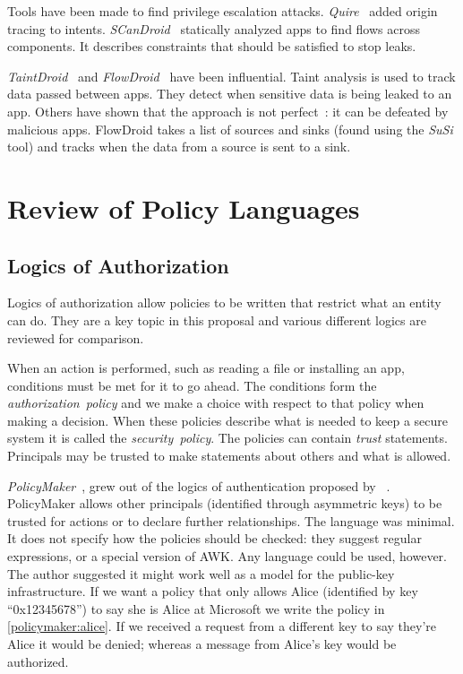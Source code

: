 \documentclass[a4paper,sfsidenotes]{%
  scrartcl%
}
\begin{document}
Tools have been made to find privilege escalation attacks.
\emph{Quire}~\cite{Bugiel:2012ui} added origin tracing to intents.
\emph{SCanDroid}~\cite{Fuchs:2009vi} statically analyzed apps to find flows
across components. It describes constraints that should be satisfied to stop
leaks. 

\emph{TaintDroid}~\cite{Enck:2010uw} and \emph{FlowDroid}~\cite{Fritz:2013vi}
have been influential.  Taint analysis is used to track data passed between
apps. They detect when sensitive data is being leaked to an app. Others have
shown that the approach is not perfect~\cite{Sarwar:2013ta}: it can be defeated
by malicious apps.  FlowDroid takes a list of sources and sinks (found using the
\emph{SuSi} tool\cite{Rasthofer:2014uq}) and tracks when the data from a source
is sent to a sink.  

\section{Review of Policy Languages}
\label{sec:authlang}

\subsection{Logics of Authorization}

Logics of authorization allow policies to be written that restrict what an
entity can do.  They are a key topic in this proposal and various different
logics are reviewed for comparison.

When an action is performed, such as reading a file or installing an app,
conditions must be met for it to go ahead. The conditions form the
\emph{authorization~policy} and we make a choice with respect to that policy
when making a decision. When these policies describe what
is needed to keep a secure system it is called the \emph{security~policy}.  The
policies can contain \emph{trust} statements. Principals may be trusted to make
statements about others and what is allowed.

\emph{PolicyMaker}~\cite{Blaze:dj}, grew out of the logics of authentication
proposed by
\citeauthor*{Wobber:1994dh}~\cite{Lampson:1992jg,Wobber:1994dh}.
PolicyMaker allows other principals (identified through asymmetric keys) to be
trusted for actions or to declare further relationships. The language was
minimal. It does not specify how the policies should be checked: they suggest
regular expressions, or  a special version of AWK. Any language could be
used, however.  The author suggested it might work well as a model for the
public-key infrastructure. If we want a policy that only allows Alice
(identified by key ``\textsf{0x12345678}'') to say she is Alice at Microsoft we
write the policy in \autoref{policymaker:alice}.  If we received a request
from a different key to say they're Alice it would be denied; whereas a message
from Alice's key would be authorized. 
\end{document}
